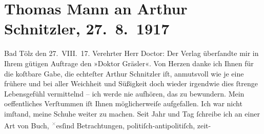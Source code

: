

         
         \renewcommand{\erwaehntePersonen}{Personen:  Molière}
         \renewcommand{\erwaehnteInstitutionen}{Institutionen: S. Fischer Verlag}
         \renewcommand{\erwaehnteOrte}{Orte: Bad Tölz, Wien}
         \renewcommand{\erwaehnteWerke}{Werke: Betrachtungen eines Unpolitischen, Doktor Gräsler, Badearzt, Scapins Streiche}
               \section[Thomas Mann an Arthur Schnitzler, 27. 8. 1917]{ Thomas Mann an Arthur Schnitzler, 27. 8. 1917}\nopagebreak{}\rehead{ }\begin{ledgroupsized}[t]{13cm}\normalsize\beginnumbering \toendnotes[C]{\smallbreak\pagebreak[2]} 
\toendnotes[C]{\smallbreak}\pstart
           \raggedleft{}{\pb}Bad Tölz den
                  27. VIII. 17.\pend
           \pstart{}Verehrter Herr Doctor:\pend\pstart
           Der Verlag überſandte mir in
               Ihrem gütigen Auftrage den »Doktor Gräsler«. Von
               Herzen danke ich Ihnen für die koſtbare Gabe, die echteſter Arthur Schnitzler iſt,
               anmutsvoll wie je eine frühere und bei aller Weichheit und Süßigkeit doch wieder  irgendwie dies ſtrenge Lebensgefühl vermittelnd –
               ich werde nie aufhören, das zu bewundern.\pend
           \pstart
           Mein oeffentliches Verſtummen iſt Ihnen {\pb}möglicherweiſe aufgefallen. Ich war nicht imſtand, meine Schuhe weiter zu machen.
               Seit Jahr und Tag ſchreibe ich an einer Art von Buch, \substVorne{}\textsuperscript{\textcolor{gray}{×}}\substDazwischen{}es\substHinten{}{ }ſind Betrachtungen, politiſch-antipolitiſch, zeit-

\end{ledgroupsized}
